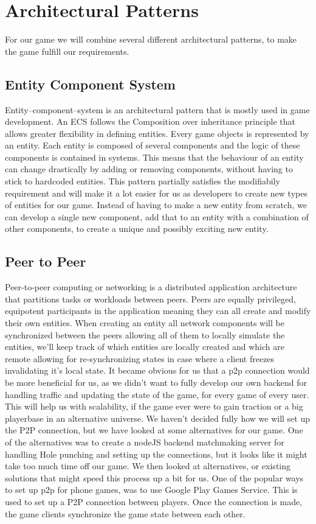 \section{Architectural Patterns}
For our game we will combine several different architectural patterns, to make the game fulfill our requirements.

\subsection{Entity Component System}
Entity–component–system \cite{wiki:ecs} is an architectural pattern that is mostly used in game development. An ECS follows the Composition over inheritance principle that allows greater flexibility in defining entities.
Every game objects is represented by an entity. Each entity is composed of several components and the logic of these components is contained in systems. This means that the behaviour of an entity can change drastically by adding or removing components, without having to stick to hardcoded entities.
This pattern partially satisfies the modifiabily requirement and will make it a lot easier for us as developers to create new types of entities for our game. Instead of having to make a new entity from scratch, we can develop a single new component, add that to an entity with a combination of other components, to create a unique and possibly exciting new entity.

\subsection{Peer to Peer}
Peer-to-peer \cite{wiki:p2p} computing or networking is a distributed application architecture that partitions tasks or workloads between peers. Peers are equally privileged, equipotent participants in the application meaning they can all create and modify their own entities. When creating an entity all network components will be synchronized between the peers allowing all of them to locally simulate the entities, we'll keep track of which entities are locally created and which are remote allowing for re-synchronizing states in case where a client freezes invalidating it's local state.
It became obvious for us that a p2p connection would be more beneficial for us, as we didn't want to fully develop our own backend for handling traffic and updating the state of the game, for every game of every user. This will help us with scalability, if the game ever were to gain traction or a big playerbase in an alternative universe.
We haven't decided fully how we will set up the P2P connection, but we have looked at some alternatives for our game.
One of the alternatives was to create a nodeJS backend matchmaking server for handling Hole punching\cite{wiki:holePunching} and setting up the connections, but it looks like it might take too much time off our game. We then looked at alternatives, or existing solutions that might speed this process up a bit for us.
One of the popular ways to set up p2p for phone games, was to use Google Play Games Service. This is used to set up a P2P connection between players. Once the connection is made, the game clients synchronize the game state between each other.

